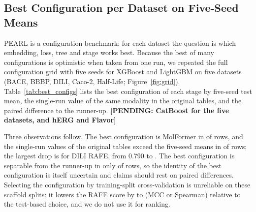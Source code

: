 \documentclass[pdflatex,sn-mathphys-num]{sn-jnl}%
\newcommand{\pending}[1]{{\color{red}\textbf{[PENDING: #1]}}}%
\begin{document}
\begin{table}[!ht]
\centering
\caption{DILI, full same-tree comparison. Mean $\pm$ SD of the test MCC over five seeds for each embedding and loss combination. Bold: best of the three stages within the row and tree. The last two rows give the difference pooled over rows and seeds with a paired bootstrap interval.}
\label{tab:full_dili}
\scriptsize

\end{table}

\begin{table}[!ht]
\centering
\caption{Caco-2, full same-tree comparison (test Spearman, mean $\pm$ SD over five seeds; layout as in Table~\ref{tab:full_dili}).}
\label{tab:full_caco2}
\scriptsize

\end{table}

\begin{table}[!ht]
\centering
\caption{BBBP, full same-tree comparison (test MCC, mean $\pm$ SD over five seeds; layout as in Table~\ref{tab:full_dili}).}
\label{tab:full_bbbp}
\scriptsize

\end{table}

\subsection{Best Configuration per Dataset on Five-Seed Means}\label{sec:best_configs}
PEARL is a configuration benchmark: for each dataset the question is which embedding, loss, tree and stage works best. Because the best of many configurations is optimistic when taken from one run, we repeated the full configuration grid with five seeds for XGBoost and LightGBM on five datasets (BACE, BBBP, DILI, Caco-2, Half-Life; Figure~\ref{fig:grid}). Table~\ref{tab:best_configs} lists the best configuration of each stage by five-seed test mean, the single-run value of the same modality in the original tables, and the paired difference to the runner-up. \pending{CatBoost for the five datasets, and hERG and Flavor}

Three observations follow. The best configuration is MolFormer in \nmf{} of \nrows{} rows, and the single-run values of the original tables exceed the five-seed means in \nsr{} of \nrows{} rows; the largest drop is for DILI RAFE, from 0.790 to \mDILIRAFE{}. The best configuration is separable from the runner-up in only \nsep{} of \nrows{} rows, so the identity of the best configuration is itself uncertain and claims should rest on paired differences. Selecting the configuration by training-split cross-validation is unreliable on these scaffold splits: it lowers the RAFE score by \gaplo{} to \gaphi{} (MCC or Spearman) relative to the test-based choice, and we do not use it for ranking.
\end{document}
